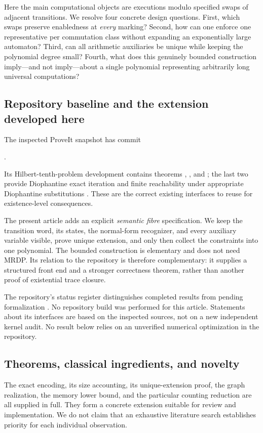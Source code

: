 \documentclass[11pt,a4paper]{article}
\theoremstyle{definition}
\theoremstyle{remark}
\newcommand{\code}[1]{\texttt{\detokenize{#1}}}
\begin{document}
Here the main computational objects are executions modulo specified swaps of adjacent transitions. We resolve four concrete design questions. First, which swaps preserve enabledness at \emph{every} marking? Second, how can one enforce one representative per commutation class without expanding an exponentially large automaton? Third, can all arithmetic auxiliaries be unique while keeping the polynomial degree small? Fourth, what does this genuinely bounded construction imply---and not imply---about a single polynomial representing arbitrarily long universal computations?

\subsection{Repository baseline and the extension developed here}
The inspected ProveIt snapshot has commit
\begin{center}
\small\code{e8bb0931d67f80d9fce87a8cddb0f661ff19f956}.
\end{center}
Its Hilbert-tenth-problem development contains theorems
, , and
; the last two provide Diophantine exact iteration and finite reachability under appropriate Diophantine substitutions \cite{repo-trace}. These are the correct existing interfaces to reuse for existence-level consequences.

The present article adds an explicit \emph{semantic fibre} specification. We keep the transition word, its states, the normal-form recognizer, and every auxiliary variable visible, prove unique extension, and only then collect the constraints into one polynomial. The bounded construction is elementary and does not need MRDP. Its relation to the repository is therefore complementary: it supplies a structured front end and a stronger correctness theorem, rather than another proof of existential trace closure.

The repository's status register distinguishes completed results from pending formalization \cite{repo-status}. No repository build was performed for this article. Statements about its interfaces are based on the inspected sources, not on a new independent kernel audit. No result below relies on an unverified numerical optimization in the repository.

\subsection{Theorems, classical ingredients, and novelty}
The exact encoding, its size accounting, its unique-extension proof, the graph realization, the memory lower bound, and the particular counting reduction are all supplied in full. They form a concrete extension suitable for review and implementation. We do not claim that an exhaustive literature search establishes priority for each individual observation.
\end{document}
